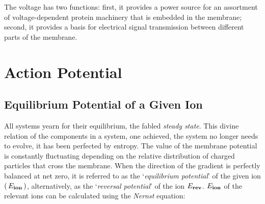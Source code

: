 \documentclass[../../Orator]{subfiles}
\begin{document}
The voltage has two functions: first, it provides a power source for an assortment of voltage-dependent protein machinery that is embedded in the membrane; second, it provides a basis for electrical signal transmission between different parts of the membrane.



\section{Action Potential}
\subsection{Equilibrium Potential of a Given Ion}
\begingroup
\allowdisplaybreaks
All systems yearn for their equilibrium, the fabled \textit{steady state}. This divine relation of the components in a system, one achieved, the system no longer needs to evolve, it has been perfected by entropy. 
The value of the membrane potential is constantly fluctuating depending on the relative distribution of charged particles that cross the membrane. 
When the direction of the gradient is perfectly balanced at net zero, it is referred to as the `\textit{equilibrium potential}' of the given ion \(\left(\,E_{\mathbf{ion}}\,\right)\), alternatively, as the `\textit{reversal potential}' of the ion \(E_{\mathbf{rev}}\). 
\(E_{\mathbf{ion}}\) of the relevant ions can be calculated using the \textit{Nernst} equation:
\end{document}
